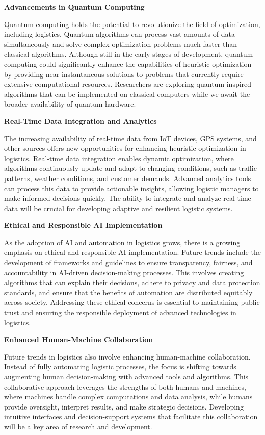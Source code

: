 \documentclass[
]{article}
\begin{document}
    \textbf{Advancements in Quantum Computing}

    Quantum computing holds the potential to revolutionize the field of optimization, including logistics. Quantum algorithms can process vast amounts of data simultaneously and solve complex optimization problems much faster than classical algorithms. Although still in the early stages of development, quantum computing could significantly enhance the capabilities of heuristic optimization by providing near-instantaneous solutions to problems that currently require extensive computational resources. Researchers are exploring quantum-inspired algorithms that can be implemented on classical computers while we await the broader availability of quantum hardware.

    \textbf{Real-Time Data Integration and Analytics}

    The increasing availability of real-time data from IoT devices, GPS systems, and other sources offers new opportunities for enhancing heuristic optimization in logistics. Real-time data integration enables dynamic optimization, where algorithms continuously update and adapt to changing conditions, such as traffic patterns, weather conditions, and customer demands. Advanced analytics tools can process this data to provide actionable insights, allowing logistic managers to make informed decisions quickly. The ability to integrate and analyze real-time data will be crucial for developing adaptive and resilient logistic systems.

    \textbf{Ethical and Responsible AI Implementation}

    As the adoption of AI and automation in logistics grows, there is a growing emphasis on ethical and responsible AI implementation. Future trends include the development of frameworks and guidelines to ensure transparency, fairness, and accountability in AI-driven decision-making processes. This involves creating algorithms that can explain their decisions, adhere to privacy and data protection standards, and ensure that the benefits of automation are distributed equitably across society. Addressing these ethical concerns is essential to maintaining public trust and ensuring the responsible deployment of advanced technologies in logistics.

    \textbf{Enhanced Human-Machine Collaboration}

    Future trends in logistics also involve enhancing human-machine collaboration. Instead of fully automating logistic processes, the focus is shifting towards augmenting human decision-making with advanced tools and algorithms. This collaborative approach leverages the strengths of both humans and machines, where machines handle complex computations and data analysis, while humans provide oversight, interpret results, and make strategic decisions. Developing intuitive interfaces and decision-support systems that facilitate this collaboration will be a key area of research and development.
\end{document}
